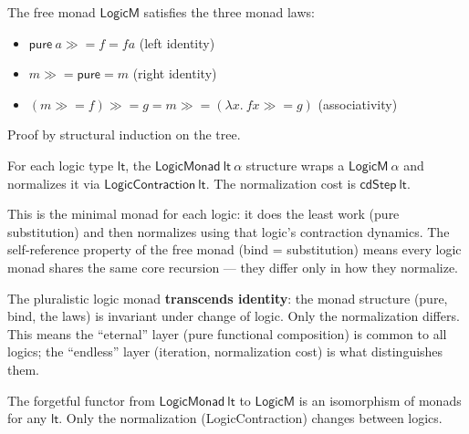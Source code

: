 \begin{theorem}
\label{thm:logic_monad_laws}
\leanok
{}
The free monad $\mathsf{LogicM}$ satisfies the three monad laws:
\begin{itemize}
  \item $\mathsf{pure}\ a \gg\!\!= f = f a$ (left identity)
  \item $m \gg\!\!= \mathsf{pure} = m$ (right identity)
  \item $(m \gg\!\!= f) \gg\!\!= g = m \gg\!\!= (\lambda x.\ f x \gg\!\!= g)$ (associativity)
\end{itemize}
Proof by structural induction on the tree.
\end{theorem}

\begin{definition}
\label{def:logic_specific_monad}
\leanok
{}
For each logic type $\mathsf{lt}$, the $\mathsf{LogicMonad}\ \mathsf{lt}\ \alpha$
structure wraps a $\mathsf{LogicM}\ \alpha$ and normalizes it via
$\mathsf{LogicContraction}\ \mathsf{lt}$. The normalization cost is
$\mathsf{cdStep}\ \mathsf{lt}$.

This is the minimal monad for each logic: it does the least work
(pure substitution) and then normalizes using that logic's contraction
dynamics. The self-reference property of the free monad (bind = substitution)
means every logic monad shares the same core recursion — they differ only
in how they normalize.

The pluralistic logic monad \textbf{transcends identity}: the monad structure
(pure, bind, the laws) is invariant under change of logic. Only the
normalization differs. This means the ``eternal'' layer (pure functional
composition) is common to all logics; the ``endless'' layer (iteration,
normalization cost) is what distinguishes them.
\end{definition}

\begin{theorem}
\label{thm:monad_invariant}
\leanok
{}
The forgetful functor from $\mathsf{LogicMonad}\ \mathsf{lt}$ to $\mathsf{LogicM}$
is an isomorphism of monads for any $\mathsf{lt}$. Only the normalization
(\textsf{LogicContraction}) changes between logics.
\end{theorem}

